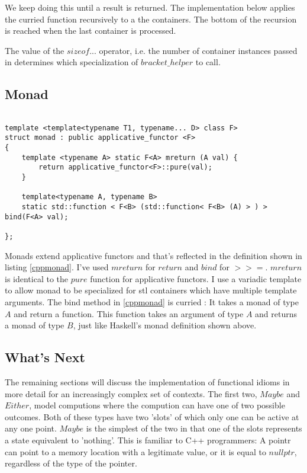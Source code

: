 \documentclass[12pt,fleqn]{article}
\begin{document}
We keep doing this until a result is returned.
The implementation below applies the curried function recursively to a the containers. 
The bottom of the recursion is reached when the last container is processed.

The value of the $sizeof...$ operator, i.e. the number of container instances passed in determines which specialization of  
$bracket\_helper$ to call.


%
%
%
\subsection{Monad}
%
%
%
\begin{minipage}{\linewidth}
\begin{lstlisting}[caption=monad defintion in C++, label=cppmonad]

template <template<typename T1, typename... D> class F> 
struct monad : public applicative_functor <F>
{
	template <typename A> static F<A> mreturn (A val) {
		return applicative_functor<F>::pure(val);
	}

	template<typename A, typename B>
	static std::function < F<B> (std::function< F<B> (A) > ) > bind(F<A> val);
	
};

\end{lstlisting}
\end{minipage}
%
%
%

Monads extend applicative functors and that's reflected in the definition shown in listing \ref{cppmonad}.
I've used $mreturn$ for $return$ and $bind$ for $>>=$.
$mreturn$ is identical to the $pure$ function for applicative functors.
I use a variadic template to allow monad to be specialized for stl containers which have multiple template arguments. 
The bind method in \ref{cppmonad} is curried : It takes a monad of type $A$ and return a function.
This function takes an argument of type $A$ and returns a monad of type $B$, just like Haskell's monad definition shown above.

%
\subsection{What's Next}
%
%
%
%
The remaining sections will discuss the implementation of functional idioms in more detail for an increasingly complex set of contexts.
The first two, $Maybe$ and $Either$, model computions where the compution can have one of two possible outcomes. 
Both of these types have two 'slots' of which only one can be active at any one point.
$Maybe$ is the simplest of the two in that one of the slots represents a state equivalent to 'nothing'. 
This is familiar to C++ programmers: A pointr can point to a memory location with a legitimate value, or it is equal to $nullptr$, regardless of the type of the pointer.
\end{document}
